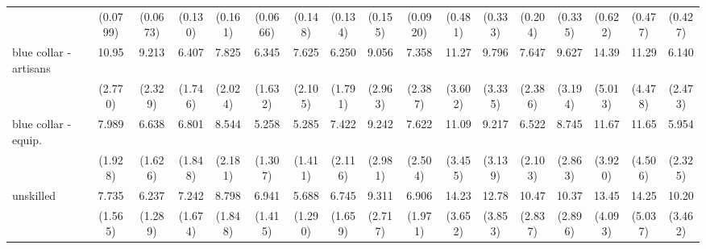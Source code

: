 {\begin{tabular}{l*{16}{c}}
                    &    (0.0799)         &    (0.0673)         &     (0.130)         &     (0.161)         &    (0.0666)         &     (0.148)         &     (0.134)         &     (0.155)         &    (0.0920)         &     (0.481)         &     (0.333)         &     (0.204)         &     (0.335)         &     (0.622)         &     (0.477)         &     (0.427)         \\
[1em]
blue collar - artisans&       10.95\sym{***}&       9.213\sym{***}&       6.407\sym{***}&       7.825\sym{***}&       6.345\sym{***}&       7.625\sym{***}&       6.250\sym{***}&       9.056\sym{***}&       7.358\sym{***}&       11.27\sym{***}&       9.796\sym{***}&       7.647\sym{***}&       9.627\sym{***}&       14.39\sym{***}&       11.29\sym{***}&       6.140\sym{***}\\
                    &     (2.770)         &     (2.329)         &     (1.746)         &     (2.024)         &     (1.632)         &     (2.105)         &     (1.791)         &     (2.963)         &     (2.387)         &     (3.602)         &     (3.335)         &     (2.386)         &     (3.194)         &     (5.013)         &     (4.478)         &     (2.473)         \\
[1em]
blue collar - equip.&       7.989\sym{***}&       6.638\sym{***}&       6.801\sym{***}&       8.544\sym{***}&       5.258\sym{***}&       5.285\sym{***}&       7.422\sym{***}&       9.242\sym{***}&       7.622\sym{***}&       11.09\sym{***}&       9.217\sym{***}&       6.522\sym{***}&       8.745\sym{***}&       11.67\sym{***}&       11.65\sym{***}&       5.954\sym{***}\\
                    &     (1.928)         &     (1.626)         &     (1.848)         &     (2.181)         &     (1.307)         &     (1.411)         &     (2.116)         &     (2.981)         &     (2.504)         &     (3.455)         &     (3.139)         &     (2.103)         &     (2.863)         &     (3.920)         &     (4.506)         &     (2.325)         \\
[1em]
unskilled           &       7.735\sym{***}&       6.237\sym{***}&       7.242\sym{***}&       8.798\sym{***}&       6.941\sym{***}&       5.688\sym{***}&       6.745\sym{***}&       9.311\sym{***}&       6.906\sym{***}&       14.23\sym{***}&       12.78\sym{***}&       10.47\sym{***}&       10.37\sym{***}&       13.45\sym{***}&       14.25\sym{***}&       10.20\sym{***}\\
                    &     (1.565)         &     (1.289)         &     (1.674)         &     (1.848)         &     (1.415)         &     (1.290)         &     (1.659)         &     (2.717)         &     (1.971)         &     (3.652)         &     (3.853)         &     (2.837)         &     (2.896)         &     (4.093)         &     (5.037)         &     (3.462)         \\

\end{tabular}}
